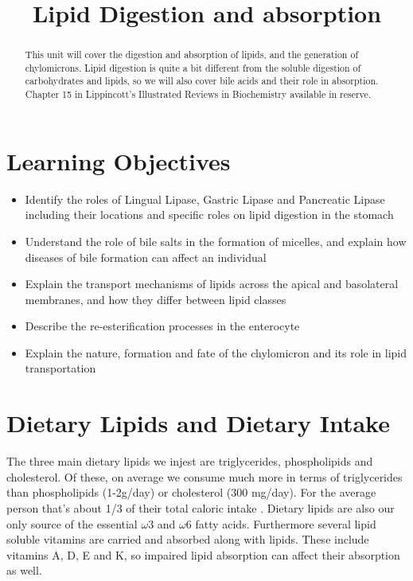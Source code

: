 \documentclass{tufte-handout}
\title{Lipid Digestion and absorption}
\author{}
\date{}  %
\begin{document}
\maketitle%

\begin{abstract}
\noindent This unit will cover the digestion and absorption of lipids, and the generation of chylomicrons.  Lipid digestion is quite a bit different from the soluble digestion of carbohydrates and lipids, so we will also cover bile acids and their role in absorption.  Chapter 15 in Lippincott's Illustrated Reviews in Biochemistry available in reserve\cite{Ferrier2017}.
\end{abstract}

\tableofcontents

\pagebreak
\section{Learning Objectives}

\begin{itemize}
\item Identify the roles of Lingual Lipase, Gastric Lipase and Pancreatic Lipase including their locations and specific roles on lipid digestion in the stomach
\item Understand the role of bile salts in the formation of micelles, and explain how diseases of bile formation can affect an individual
\item Explain the transport mechanisms of lipids across the apical and basolateral membranes, and how they differ between lipid classes
\item Describe the re-esterification processes in the enterocyte
\item Explain the nature, formation and fate of the chylomicron and its role in lipid transportation



\end{itemize}

\section{Dietary Lipids and Dietary Intake}

The three main dietary lipids we injest are triglycerides, phospholipids and cholesterol.  Of these, on average we consume much more in terms of triglycerides than phospholipids (1-2g/day) or cholesterol (300 mg/day).  For the average person that's about 1/3 of their total caloric intake \citep{NationalCenterforHealthStatistics2017}.  Dietary lipids are also our only source of the essential $\omega$3 and $\omega$6 fatty acids.  Furthermore several lipid soluble vitamins are carried and absorbed along with lipids.  These include vitamins A, D, E and K, so impaired lipid absorption can affect their absorption as well.
\end{document}
